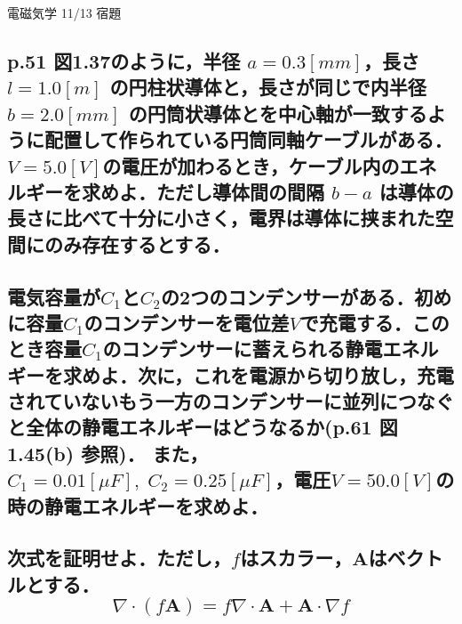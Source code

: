 \documentclass[a4paper, 12pt]{bxjsarticle}
\begin{document}
\begin{center}
    \begin{huge}
        電磁気学 11/13 宿題
    \end{huge}
\end{center}

\subsection{p.51 図1.37のように，半径 \(a=0.3\si{[mm]}\)，長さ \(l=1.0\si{[m]}\) の円柱状導体と，長さが同じで内半径 \(b=2.0\si{[mm]}\) の円筒状導体とを中心軸が一致するように配置して作られている円筒同軸ケーブルがある．\(V=5.0\si{[V]}\)の電圧が加わるとき，ケーブル内のエネルギーを求めよ．ただし導体間の間隔 \(b-a\) は導体の長さに比べて十分に小さく，電界は導体に挟まれた空間にのみ存在するとする．}


\newpage

\subsection{電気容量が\(C_1\)と\(C_2\)の2つのコンデンサーがある．初めに容量\(C_1\)のコンデンサーを電位差\(V\)で充電する．このとき容量\(C_1\)のコンデンサーに蓄えられる静電エネルギーを求めよ．次に，これを電源から切り放し，充電されていないもう一方のコンデンサーに並列につなぐと全体の静電エネルギーはどうなるか(p.61 図1.45(b) 参照)．
また，\(C_1=0.01 \si{[\mu F]},\;C_2=0.25\si{[\mu F]}\)，電圧\(V=50.0\si{[V]}\)の時の静電エネルギーを求めよ．}
\newpage

\subsection{次式を証明せよ．ただし，\(f\)はスカラー，\(\boldsymbol{A}\)はベクトルとする．\[\nabla\cdot(f\boldsymbol{A})=f\nabla\cdot\boldsymbol{A}+\boldsymbol{A}\cdot\nabla f\]}
\end{document}
